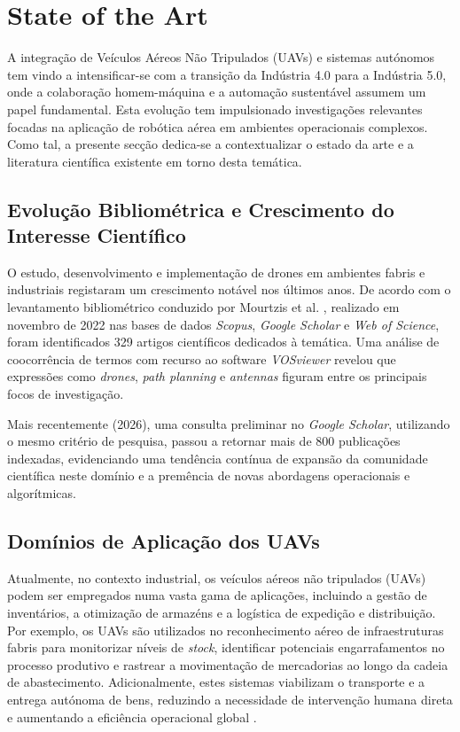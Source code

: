 \documentclass[conference,a4paper]{IEEEtran}
\begin{document}
\section{State of the Art}
A integração de Veículos Aéreos Não Tripulados (UAVs) e sistemas autónomos tem vindo a intensificar-se com a transição da Indústria 4.0 para a Indústria 5.0, onde a colaboração homem-máquina e a automação sustentável assumem um papel fundamental. Esta evolução tem impulsionado investigações relevantes focadas na aplicação de robótica aérea em ambientes operacionais complexos. Como tal, a presente secção dedica-se a contextualizar o estado da arte e a literatura científica existente em torno desta temática.

\subsection{Evolução Bibliométrica e Crescimento do Interesse Científico}
O estudo, desenvolvimento e implementação de drones em ambientes fabris e industriais registaram um crescimento notável nos últimos anos. De acordo com o levantamento bibliométrico conduzido por Mourtzis et al. \cite{Mourtzis02052024}, realizado em novembro de 2022 nas bases de dados \textit{Scopus}, \textit{Google Scholar} e \textit{Web of Science}, foram identificados 329 artigos científicos dedicados à temática. Uma análise de coocorrência de termos com recurso ao software \textit{VOSviewer} revelou que expressões como \textit{drones}, \textit{path planning} e \textit{antennas} figuram entre os principais focos de investigação.

Mais recentemente (2026), uma consulta preliminar no \textit{Google Scholar}, utilizando o mesmo critério de pesquisa, passou a retornar mais de 800 publicações indexadas, evidenciando uma tendência contínua de expansão da comunidade científica neste domínio e a premência de novas abordagens operacionais e algorítmicas.

\subsection{Domínios de Aplicação dos UAVs}
Atualmente, no contexto industrial, os veículos aéreos não tripulados (UAVs) podem ser empregados numa vasta gama de aplicações, incluindo a gestão de inventários, a otimização de armazéns e a logística de expedição e distribuição. Por exemplo, os UAVs são utilizados no reconhecimento aéreo de infraestruturas fabris para monitorizar níveis de \textit{stock}, identificar potenciais engarrafamentos no processo produtivo e rastrear a movimentação de mercadorias ao longo da cadeia de abastecimento. Adicionalmente, estes sistemas viabilizam o transporte e a entrega autónoma de bens, reduzindo a necessidade de intervenção humana direta e aumentando a eficiência operacional global \cite{Mourtzis02052024}.
\end{document}

